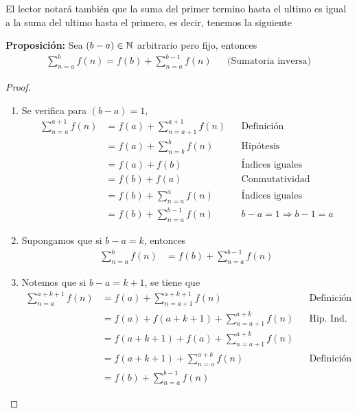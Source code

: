     El lector notará también que la suma del primer termino hasta el ultimo es
    igual a la suma del ultimo hasta el primero, es decir, tenemos la siguiente

    \textbf{Proposición:} Sea $(b-a)\in \mathbb{N}$ arbitrario pero fijo, entonces
    \begin{align*}
      \sum_{n=a}^{b} f(n) = f(b) + \sum_{n=a}^{b-1} f(n) && \text{(Sumatoria inversa)}
    \end{align*}

    \begin{proof}\leavevmode
      \begin{enumerate}[label=\Roman*)]
          \item Se verifica para $(b-a)=1$,
          \begin{align*}
            \sum_{n=a}^{a+1} f(n) &= f(a) + \sum_{n=a+1}^{a+1} f(n) && \text{Definición}\\
            &= f(a) + \sum_{n=b}^{b} f(n) && \text{Hipótesis}\\
            &= f(a) + f(b) && \text{Índices iguales}\\
            &= f(b) + f(a) && \text{Conmutatividad}\\
            &= f(b) + \sum_{n=a}^{a} f(n) && \text{Índices iguales}\\
            &= f(b) + \sum_{n=a}^{b-1} f(n) && \text{$b-a=1 \Rightarrow b-1=a$}
          \end{align*}

          \item Supongamos que si $b-a=k$, entonces
          \begin{align*}
            \sum_{n=a}^{b} f(n) &= f(b) + \sum_{n=a}^{b-1} f(n)
          \end{align*}

          \item Notemos que si $b-a=k+1$, se tiene que
          \begin{align*}
            \sum_{n=a}^{a+k+1} f(n) &= f(a) + \sum_{n=a+1}^{a+k+1} f(n) && \text{Definición}\\
            &= f(a) + f(a+k+1) + \sum_{n=a+1}^{a+k} f(n) && \text{Hip. Ind.}\\
            &= f(a+k+1) + f(a) + \sum_{n=a+1}^{a+k} f(n)\\
            &= f(a+k+1) + \sum_{n=a}^{a+k} f(n) && \text{Definición}\\
            &= f(b) + \sum_{n=a}^{b-1} f(n)
          \end{align*}
        \end{enumerate}
    \end{proof}

